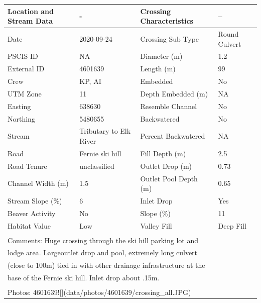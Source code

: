 \documentclass[
]{book}
\begin{document}
\begin{tabular}{llll}
\toprule
Location and Stream Data & - & Crossing Characteristics & --\\
\midrule
Date & 2020-09-24 & Crossing Sub Type & Round Culvert\\
PSCIS ID & NA & Diameter (m) & 1.2\\
External ID & 4601639 & Length (m) & 99\\
Crew & KP, AI & Embedded & No\\
UTM Zone & 11 & Depth Embedded (m) & NA\\
\addlinespace
Easting & 638630 & Resemble Channel & No\\
Northing & 5480655 & Backwatered & No\\
Stream & Tributary to Elk River & Percent Backwatered & NA\\
Road & Fernie ski hill & Fill Depth (m) & 2.5\\
Road Tenure & unclassified & Outlet Drop (m) & 0.73\\
\addlinespace
Channel Width (m) & 1.5 & Outlet Pool Depth (m) & 0.65\\
Stream Slope (\%) & 6 & Inlet Drop & Yes\\
Beaver Activity & No & Slope (\%) & 11\\
Habitat Value & Low & Valley Fill & Deep Fill\\
\bottomrule
\multicolumn{4}{l}{\textsuperscript{} Comments: Huge crossing through the ski hill parking lot and}\\
\multicolumn{4}{l}{lodge area.  Largeoutlet drop and pool, extremely long culvert}\\
\multicolumn{4}{l}{(close to 100m) tied in with other drainage infrastructure at the}\\
\multicolumn{4}{l}{base of the Fernie ski hill. Inlet drop about .15m.}\\
\multicolumn{4}{l}{\textsuperscript{} Photos: 4601639![](data/photos/4601639/crossing\_all.JPG)}\\
\end{tabular}
\end{document}
